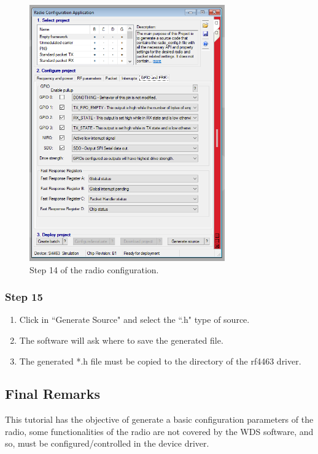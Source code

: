 \begin{figure}[!h]
	\begin{center}
		\includegraphics[width=0.75\textwidth]{figures/wds-tutorial/wds-tutorial-14.png}
		\caption{Step 14 of the radio configuration.}
		\label{fig:wds-tutorial-step-14}
	\end{center}
\end{figure}

\subsubsection{Step 15}

\begin{enumerate}
    \item Click in ``Generate Source" and select the ``.h" type of source.
    \item The software will ask where to save the generated file.
    \item The generated *.h file must be copied to the directory of the rf4463 driver.
\end{enumerate}

\subsection{Final Remarks}

This tutorial has the objective of generate a basic configuration parameters of the radio, some functionalities of the radio are not covered by the WDS software, and so, must be configured/controlled in the device driver.

